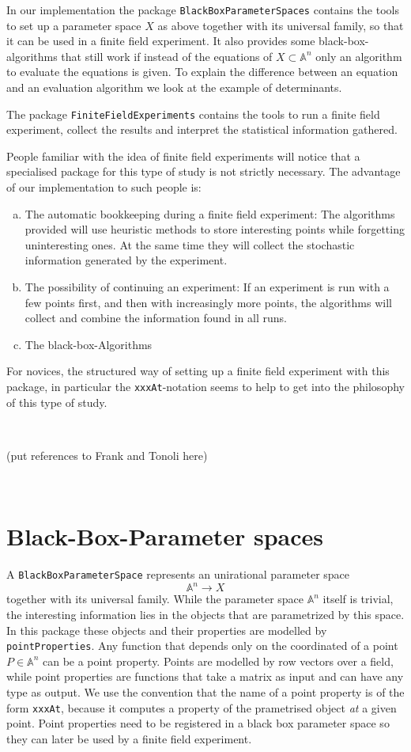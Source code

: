 \documentclass[12pt,a4paper]{amsart}
\theoremstyle{plain}
\theoremstyle{definition}
\renewcommand{\AA}{\mathbb A}
\begin{document}
In our implementation the package {\tt BlackBoxParameterSpaces} contains the tools to set up a parameter space $X$ as above together with its universal family, so that it can be used in a finite field experiment. It also provides some black-box-algorithms that still work if instead of the equations of $X \subset \AA^n$ only an algorithm to evaluate the equations is given. To explain the difference between an equation and an evaluation algorithm we look at the example of determinants.

The package {\tt FiniteFieldExperiments} contains the tools to run a finite field experiment, collect the results and interpret the statistical information gathered. 

People familiar with the idea of finite field experiments will notice that a specialised package for this type of study is not strictly necessary. The advantage of our implementation to such people is:
\begin{enumerate}[(a)]
\item The automatic bookkeeping during a finite field experiment: The algorithms provided will use heuristic methods to store interesting points while forgetting uninteresting ones. At the same time they will collect the stochastic information generated by the experiment. 
\item The possibility of continuing an experiment: If an experiment is run with a few points first, and then with increasingly more points, the algorithms will collect and combine the information found in all runs. 
\item The black-box-Algorithms 
\end{enumerate}
For novices, the structured way of setting up a finite field experiment with this package, in particular the {\tt xxxAt}-notation seems to help to get into the philosophy of this type of study. 

\

{\color{red} (put references to Frank and Tonoli here)}

\

\section{Black-Box-Parameter spaces}
\label{sBlackBoxParameterSpace}

A {\tt BlackBoxParameterSpace} represents an unirational parameter space
\[
	\AA^n \to X
\]
together with its universal family. While the parameter space $\AA^n$ itself is trivial, the interesting information lies in the objects that are parametrized by this space. In this package these objects and their properties are modelled by {\tt pointProperties}. Any function that depends only on the coordinated of a point $P \in \AA^n$ can be a point property. Points are modelled by row vectors over a field, while 
point properties are functions that take a matrix as input and can have any type as output. We use the convention that the name of a point property is of the form {\tt xxxAt}, because it computes a property of the prametrised object {\sl at} a given point. Point properties need to be registered in a black box parameter space so they can later be used by a finite field experiment. 
\end{document}
